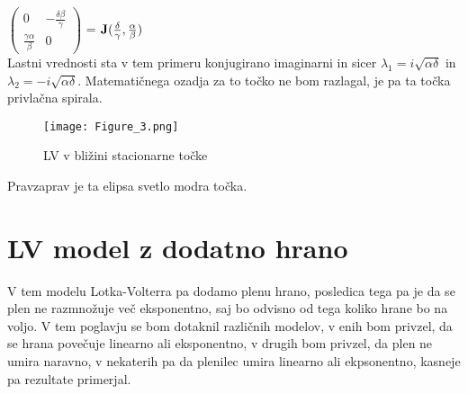 \documentclass[11pt]{report}
\begin{document}
	
	
	\hspace{35mm}
	$\begin{pmatrix}
		0 & -\frac{\delta \beta}{\gamma} \\ 
		\frac{\gamma \alpha}{\beta}  & 0
	\end{pmatrix}$
	= ${\bf J(\frac{\delta}{\gamma}, \frac{\alpha}{\beta})}$\\
 	Lastni vrednosti sta v tem primeru konjugirano imaginarni in sicer $\lambda_1 = i\sqrt{\alpha \delta}$ in $\lambda_2 = -i\sqrt{\alpha \delta}$.
 	Matematičnega ozadja za to točko ne bom razlagal, je pa ta točka privlačna spirala.
 	\begin{figure}[!ht]
 		\centering
 		\hspace{-35mm}
 		\vspace{8mm}
 		\begin{minipage}{0.8\textwidth}
 			\centering
 			\vspace{-5mm}
 			\texttt{[image: Figure\_3.png]}
 			\hspace{-10mm}
 			\vspace{-5mm}
 			\caption{LV v bližini stacionarne točke}
 		\end{minipage}
 	\end{figure}
 	Pravzaprav je ta elipsa svetlo modra točka.
 	\newpage
 	\section{LV model z dodatno hrano}
 	V tem modelu Lotka-Volterra pa dodamo plenu hrano, posledica tega pa je da se plen ne razmnožuje več eksponentno, saj bo odvisno od tega koliko hrane bo na voljo.
 	V tem poglavju se bom dotaknil različnih modelov, v enih bom privzel, da se hrana povečuje linearno ali eksponentno, v drugih bom privzel, da plen ne umira naravno, v nekaterih pa da plenilec umira linearno ali ekpsonentno, kasneje pa rezultate primerjal.
\end{document}
